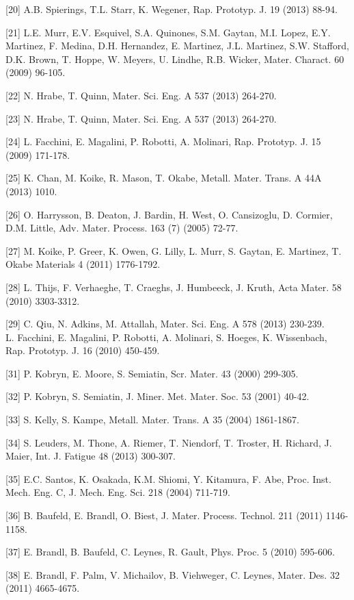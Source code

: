 \documentclass[10pt]{article}
\begin{document}
[20] A.B. Spierings, T.L. Starr, K. Wegener, Rap. Prototyp. J. 19 (2013) 88-94.

[21] L.E. Murr, E.V. Esquivel, S.A. Quinones, S.M. Gaytan, M.I. Lopez, E.Y. Martinez, F. Medina, D.H. Hernandez, E. Martinez, J.L. Martinez, S.W. Stafford, D.K. Brown, T. Hoppe, W. Meyers, U. Lindhe, R.B. Wicker, Mater. Charact. 60 (2009) 96-105.

[22] N. Hrabe, T. Quinn, Mater. Sci. Eng. A 537 (2013) 264-270.

[23] N. Hrabe, T. Quinn, Mater. Sci. Eng. A 537 (2013) 264-270.

[24] L. Facchini, E. Magalini, P. Robotti, A. Molinari, Rap. Prototyp. J. 15 (2009) 171-178.

[25] K. Chan, M. Koike, R. Mason, T. Okabe, Metall. Mater. Trans. A 44A (2013) 1010.

[26] O. Harrysson, B. Deaton, J. Bardin, H. West, O. Cansizoglu, D. Cormier, D.M. Little, Adv. Mater. Process. 163 (7) (2005) 72-77.

[27] M. Koike, P. Greer, K. Owen, G. Lilly, L. Murr, S. Gaytan, E. Martinez, T. Okabe Materials 4 (2011) 1776-1792.

[28] L. Thijs, F. Verhaeghe, T. Craeghs, J. Humbeeck, J. Kruth, Acta Mater. 58 (2010) 3303-3312.

[29] C. Qiu, N. Adkins, M. Attallah, Mater. Sci. Eng. A 578 (2013) 230-239.\\
[30] L. Facchini, E. Magalini, P. Robotti, A. Molinari, S. Hoeges, K. Wissenbach, Rap. Prototyp. J. 16 (2010) 450-459.

[31] P. Kobryn, E. Moore, S. Semiatin, Scr. Mater. 43 (2000) 299-305.

[32] P. Kobryn, S. Semiatin, J. Miner. Met. Mater. Soc. 53 (2001) 40-42.

[33] S. Kelly, S. Kampe, Metall. Mater. Trans. A 35 (2004) 1861-1867.

[34] S. Leuders, M. Thone, A. Riemer, T. Niendorf, T. Troster, H. Richard, J. Maier, Int. J. Fatigue 48 (2013) 300-307.

[35] E.C. Santos, K. Osakada, K.M. Shiomi, Y. Kitamura, F. Abe, Proc. Inst. Mech. Eng. C, J. Mech. Eng. Sci. 218 (2004) 711-719.

[36] B. Baufeld, E. Brandl, O. Biest, J. Mater. Process. Technol. 211 (2011) 1146-1158.

[37] E. Brandl, B. Baufeld, C. Leynes, R. Gault, Phys. Proc. 5 (2010) 595-606.

[38] E. Brandl, F. Palm, V. Michailov, B. Viehweger, C. Leynes, Mater. Des. 32 (2011) 4665-4675.
\end{document}
